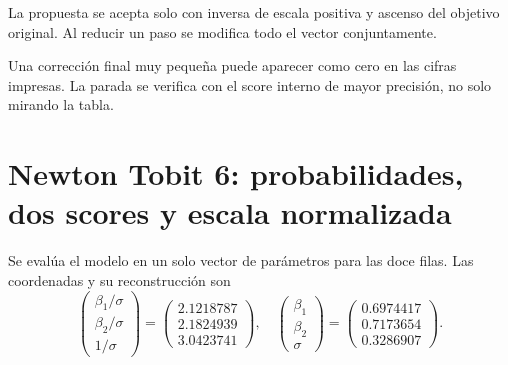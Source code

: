 \documentclass[11pt,a4paper]{article}
\begin{document}
La propuesta se acepta solo con
inversa de escala positiva
y ascenso del objetivo original.
Al reducir un paso se modifica
todo el vector conjuntamente.

Una corrección final muy pequeña
puede aparecer como cero
en las cifras impresas.
La parada se verifica con
el score interno de mayor precisión,
no solo mirando la tabla.

\clearpage
\section{Newton Tobit 6: probabilidades, dos scores y escala normalizada}\label{unidad112}
Se evalúa el modelo en un solo vector
de parámetros para las doce filas.
Las coordenadas y su reconstrucción son
\[
\begin{pmatrix}\beta_1/\sigma\\\beta_2/\sigma\\1/\sigma\end{pmatrix}=\begin{pmatrix}2.1218787\\2.1824939\\3.0423741\end{pmatrix},\quad\begin{pmatrix}\beta_1\\\beta_2\\\sigma\end{pmatrix}=\begin{pmatrix}0.6974417\\0.7173654\\0.3286907\end{pmatrix}.
\]
\end{document}
